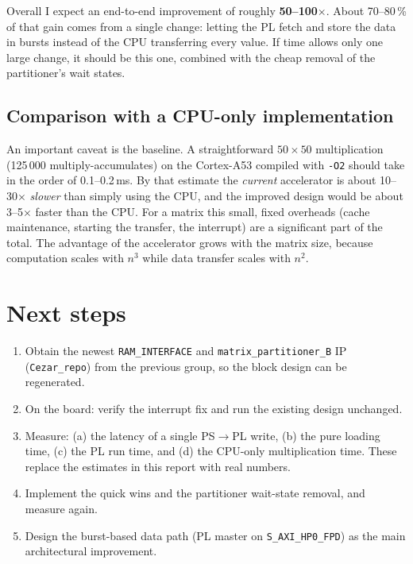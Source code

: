 \documentclass[11pt,a4paper]{article}
\newcommand{\code}[1]{\texttt{#1}}
\begin{document}
Overall I expect an end-to-end improvement of roughly \textbf{50--100$\times$}. About 70--80\,\% of that gain comes from a single change: letting the PL fetch and store the data in bursts instead of the CPU transferring every value. If time allows only one large change, it should be this one, combined with the cheap removal of the partitioner's wait states.

\subsection{Comparison with a CPU-only implementation}
An important caveat is the baseline. A straightforward $50\times50$ multiplication (125\,000 multiply-accumulates) on the Cortex-A53 compiled with \code{-O2} should take in the order of 0.1--0.2\,ms. By that estimate the \emph{current} accelerator is about 10--30$\times$ \emph{slower} than simply using the CPU, and the improved design would be about 3--5$\times$ faster than the CPU. For a matrix this small, fixed overheads (cache maintenance, starting the transfer, the interrupt) are a significant part of the total. The advantage of the accelerator grows with the matrix size, because computation scales with $n^3$ while data transfer scales with $n^2$.

\section{Next steps}
\begin{enumerate}
  \item Obtain the newest \code{RAM\_INTERFACE} and \code{matrix\_partitioner\_B} IP (\code{Cezar\_repo}) from the previous group, so the block design can be regenerated.
  \item On the board: verify the interrupt fix and run the existing design unchanged.
  \item Measure: (a) the latency of a single PS$\rightarrow$PL write, (b) the pure loading time, (c) the PL run time, and (d) the CPU-only multiplication time. These replace the estimates in this report with real numbers.
  \item Implement the quick wins and the partitioner wait-state removal, and measure again.
  \item Design the burst-based data path (PL master on \code{S\_AXI\_HP0\_FPD}) as the main architectural improvement.
\end{enumerate}
\end{document}
